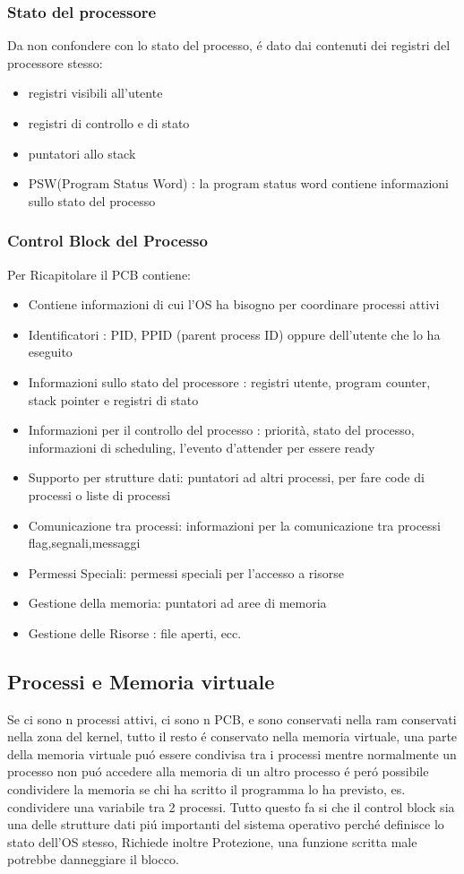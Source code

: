 \documentclass[11pt]{article}
\begin{document}
\subsubsection{Stato del processore}
Da non confondere con lo stato del processo, é dato dai contenuti dei registri del processore stesso:
\begin{itemize}
    \item registri visibili all'utente
    \item registri di controllo e di stato
    \item puntatori allo stack
    \item PSW(Program Status Word) : la program status word contiene informazioni sullo stato del processo
    \end{itemize}
\subsubsection{Control Block del Processo}
Per Ricapitolare il PCB contiene:
\begin{itemize}
    \item Contiene informazioni di cui l'OS ha bisogno per coordinare processi attivi
    \item Identificatori : PID, PPID (parent process ID) oppure dell'utente che lo ha eseguito
    \item Informazioni sullo stato del processore : registri utente, program counter, stack pointer e registri di stato
    \item Informazioni per il controllo del processo : priorità, stato del processo, informazioni di scheduling, l'evento d'attender per essere ready
    \item Supporto per strutture dati: puntatori ad altri processi, per fare code di processi o liste di processi
    \item Comunicazione tra processi: informazioni per la comunicazione tra processi flag,segnali,messaggi
    \item Permessi Speciali: permessi speciali per l'accesso a risorse
    \item Gestione della memoria: puntatori ad aree di memoria
    \item Gestione delle Risorse : file aperti, ecc.
\end{itemize}
\subsection{Processi e Memoria virtuale}
Se ci sono n processi attivi, ci sono n PCB, e sono conservati nella ram conservati nella zona del kernel, tutto il
resto é conservato nella memoria virtuale, una parte della memoria virtuale puó essere condivisa tra i processi mentre
normalmente un processo non puó accedere alla memoria di un altro processo é peró possibile
condividere la memoria se chi ha scritto il programma lo ha previsto, es. condividere una variabile tra 2 processi.
Tutto questo fa si che il control block sia una delle strutture dati piú importanti del sistema operativo perché definisce lo stato dell'OS stesso,
Richiede inoltre Protezione, una funzione scritta male potrebbe danneggiare il blocco.
\end{document}
